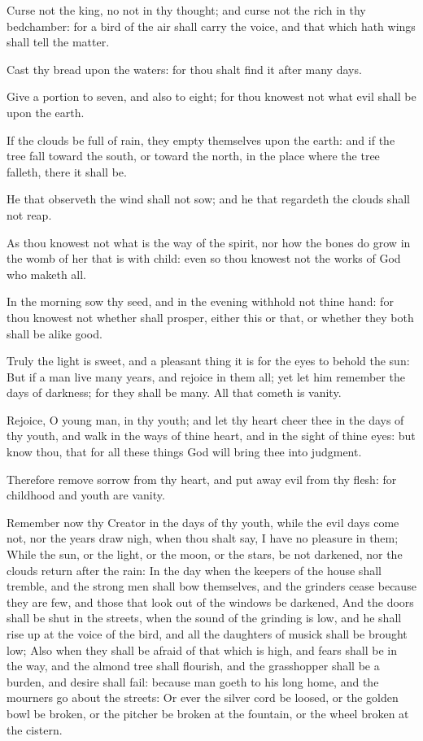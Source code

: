 \Verse Curse not the king, no not in thy thought; and curse not the rich in thy bedchamber: for a bird of the air shall carry the voice, and that which hath wings shall tell the matter.


\Chapter
\Verse Cast thy bread upon the waters: for thou shalt find it after many days.

\Verse Give a portion to seven, and also to eight; for thou knowest not what evil shall be upon the earth.

\Verse If the clouds be full of rain, they empty themselves upon the earth: and if the tree fall toward the south, or toward the north, in the place where the tree falleth, there it shall be.

\Verse He that observeth the wind shall not sow; and he that regardeth the clouds shall not reap.

\Verse As thou knowest not what is the way of the spirit, nor how the bones do grow in the womb of her that is with child: even so thou knowest not the works of God who maketh all.

\Verse In the morning sow thy seed, and in the evening withhold not thine hand: for thou knowest not whether shall prosper, either this or that, or whether they both shall be alike good.

\Verse Truly the light is sweet, and a pleasant thing it is for the eyes to behold the sun: \Verse But if a man live many years, and rejoice in them all; yet let him remember the days of darkness; for they shall be many. All that cometh is vanity.

\Verse Rejoice, O young man, in thy youth; and let thy heart cheer thee in the days of thy youth, and walk in the ways of thine heart, and in the sight of thine eyes: but know thou, that for all these things God will bring thee into judgment.

\Verse Therefore remove sorrow from thy heart, and put away evil from thy flesh: for childhood and youth are vanity.


\Chapter
\Verse Remember now thy Creator in the days of thy youth, while the evil days come not, nor the years draw nigh, when thou shalt say, I have no pleasure in them; \Verse While the sun, or the light, or the moon, or the stars, be not darkened, nor the clouds return after the rain: \Verse In the day when the keepers of the house shall tremble, and the strong men shall bow themselves, and the grinders cease because they are few, and those that look out of the windows be darkened, \Verse And the doors shall be shut in the streets, when the sound of the grinding is low, and he shall rise up at the voice of the bird, and all the daughters of musick shall be brought low; \Verse Also when they shall be afraid of that which is high, and fears shall be in the way, and the almond tree shall flourish, and the grasshopper shall be a burden, and desire shall fail: because man goeth to his long home, and the mourners go about the streets: \Verse Or ever the silver cord be loosed, or the golden bowl be broken, or the pitcher be broken at the fountain, or the wheel broken at the cistern.

